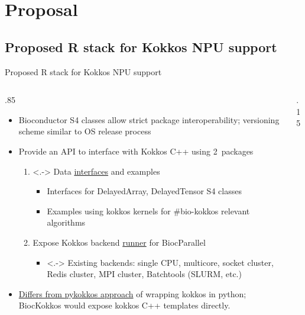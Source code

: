 \documentclass[
aspectratio=169,
xcolor={usenames}
]{beamer}
\begin{document}
\section{Proposal}

\subsection{Proposed R stack for Kokkos NPU support}
\begin{frame}{Proposed R stack for Kokkos NPU support}
  \begin{columns}[T]
    \begin{column}{.85\framewidth}
      \begin{itemize}[<+->]
      \item Bioconductor S4 classes %
        allow strict package interoperability; %
        versioning scheme similar to OS release process
      \item Provide an API to interface with Kokkos C++ using 2~packages
        \begin{enumerate}
        \item<.-> Data \ul{interfaces} and examples
          \begin{itemize}[<.->]
          \item Interfaces for DelayedArray, DelayedTensor S4 classes
          \item Examples using kokkos kernels %
            for \#bio-kokkos relevant algorithms
          \end{itemize}
        \item Expose Kokkos backend \ul{runner} for BiocParallel
          \begin{itemize}
          \item<.-> Existing backends: %
            single CPU, %
            multicore, %
            socket cluster, %
            Redis cluster, %
            MPI cluster, %
            Batchtools (SLURM, etc.)
          \end{itemize}
        \end{enumerate}
      \item \ul{Differs from pykokkos approach} of wrapping kokkos in python;
        BiocKokkos would expose kokkos C++ templates directly.
      \end{itemize}
    \end{column}
    \begin{column}{.15\framewidth}
      \begin{tikzpicture}[%
        every node/.style = {
          inner sep = 0pt,
          outer sep = 0pt
        }
        ]

\end{tikzpicture}
\end{column}
\end{columns}
\end{frame}
\end{document}
